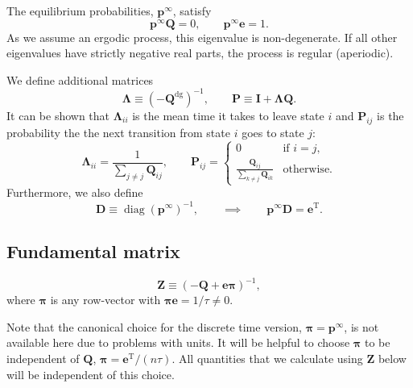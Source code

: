 \documentclass[12pt]{article}
\newcommand{\inv}{^{-1}}
\newcommand{\dg}{^\mathrm{dg}}
\newcommand{\trans}{^\mathrm{T}}
\newcommand{\I}{\mathbf{I}}
\newcommand{\onev}{\mathbf{e}}
\newcommand{\MM}{\mathbf{Q}}
\newcommand{\eq}{\mathbf{p}^\infty}
\newcommand{\fund}{\mathbf{Z}}
\newcommand{\Pb}{\mathbf{P}}
\newcommand{\D}{\mathbf{D}}
\newcommand{\pib}{\boldsymbol{\pi}}
\newcommand{\Lb}{\boldsymbol{\Lambda}}
\begin{document}
The equilibrium probabilities, $\eq$, satisfy
%
\begin{equation}\label{eq:equilibrium}
  \eq\MM=0,
  \qquad
  \eq\onev=1.
\end{equation}
%
As we assume an ergodic process, this eigenvalue is non-degenerate.
If all other eigenvalues have strictly negative real parts, the process is regular (aperiodic).

We define additional matrices
%
\begin{equation}\label{eq:defDLP}
  \Lb \equiv (-\MM\dg)\inv,
  \qquad
  \Pb \equiv \I + \Lb\MM.
\end{equation}
%
It can be shown that $\Lb_{ii}$ is the mean time it takes to leave state $i$ and $\Pb_{ij}$ is the probability the the next transition from state $i$ goes to state $j$:
%
\begin{equation}\label{eq:LamdaPcmpt}
  \Lb_{ii} = \frac{1}{\sum_{j \neq j} \MM_{ij}},
  \qquad
  \Pb_{ij} = %
  \begin{cases}
     0                                         &\text{if }i=j, \\
     \frac{\MM_{ij}}{\sum_{k \neq j} \MM_{ik}} &\text{otherwise}.
  \end{cases}
\end{equation}
%
Furthermore, we also define
%
\begin{equation}\label{eq:pdotD}
  \D \equiv \operatorname{diag}(\eq)\inv,
  \qquad\implies\qquad
  \eq\D=\onev\trans.
\end{equation}
%

\subsection{Fundamental matrix}\label{sec:fund}

\begin{defn}
  \begin{equation}\label{eq:funddef}
    \fund \equiv (-\MM + \onev\pib)\inv,
  \end{equation}
  where $\pib$ is any row-vector with $\pib\onev=1/\tau\neq0$.
\end{defn}
Note that the canonical choice for the discrete time version, $\pib=\eq$, is not available here due to problems with units.
It will be helpful to choose $\pib$ to be independent of $\MM$, \eg $\pib=\onev\trans/(n\tau)$.
All quantities that we calculate using $\fund$ below will be independent of this choice.
\end{document}
